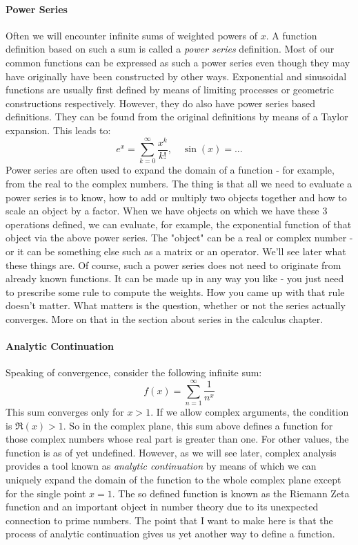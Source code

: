 \paragraph{Power Series}
Often we will encounter infinite sums of weighted powers of $x$. A function definition based on such a sum is called a \emph{power series} definition. Most of our common functions can be expressed as such a power series even though they may have originally have been constructed by other ways. Exponential and sinusoidal functions are usually first defined by means of limiting processes or geometric constructions respectively. However, they do also have power series based definitions. They can be found from the original definitions by means of a Taylor expansion. This leads to:
\begin{equation}
e^x = \sum_{k=0}^\infty \frac{x^k}{k!}, \quad
\sin(x) = ...
\end{equation}
Power series are often used to expand the domain of a function - for example, from the real to the complex numbers. The thing is that all we need to evaluate a power series is to know, how to add or multiply two objects together and how to scale an object by a factor. When we have objects on which we have these 3 operations defined, we can evaluate, for example, the exponential function of that object via the above power series. The "object" can be a real or complex number - or it can be something else such as a matrix or an operator. We'll see later what these things are. Of course, such a power series does not need to originate from already known functions. It can be made up in any way you like - you just need to prescribe some rule to compute the weights. How you came up with that rule doesn't matter. What matters is the question, whether or not the series actually converges. More on that in the section about series in the calculus chapter.

\paragraph{Analytic Continuation}
Speaking of convergence, consider the following infinite sum:
\begin{equation}
	f(x) = \sum_{n=1}^\infty \frac{1}{n^x}
\end{equation}
This sum converges only for $x > 1$. If we allow complex arguments, the condition is $\Re(x) > 1$. So in the complex plane, this sum above defines a function for those complex numbers whose real part is greater than one. For other values, the function is as of yet undefined. However, as we will see later, complex analysis provides a tool known as \emph{analytic continuation} by means of which we can uniquely expand the domain of the function to the whole complex plane except for the single point $x=1$. The so defined function is known as the Riemann Zeta function and an important object in number theory due to its unexpected connection to prime numbers. The point that I want to make here is that the process of analytic continuation gives us yet another way to define a function.

